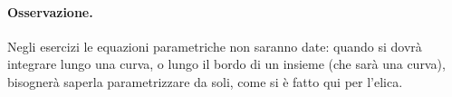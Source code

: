 \paragraph{Osservazione.} Negli esercizi le equazioni parametriche non saranno date:
quando si dovrà integrare lungo una curva, o lungo il bordo di un insieme (che sarà una
curva), bisognerà saperla parametrizzare da soli, come si è fatto qui per l'elica.

